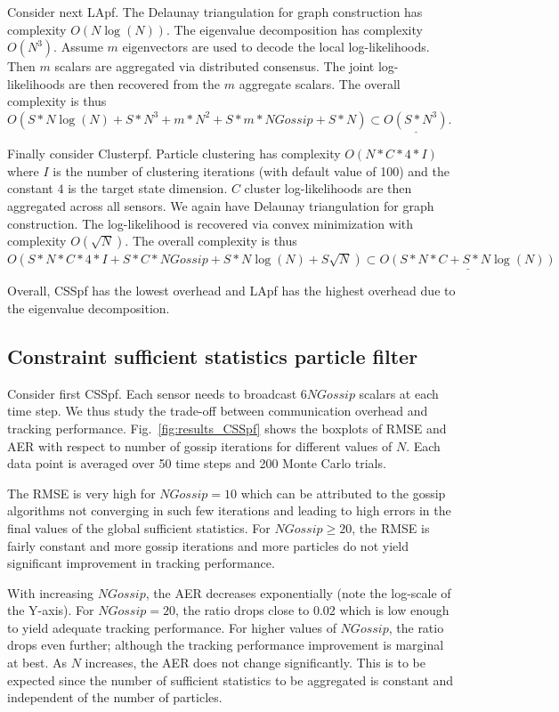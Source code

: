 \documentclass[10pt,letterpaper,final]{article}
\begin{document}
Consider next LApf. The Delaunay triangulation for graph construction has complexity $O(N\log(N))$. The eigenvalue decomposition has complexity $O(N^3)$. Assume $m$ eigenvectors are used to decode the local log-likelihoods. Then $m$ scalars are aggregated via distributed consensus. The joint log-likelihoods are then recovered from the $m$ aggregate scalars. The overall complexity is thus $O(S*N\log(N)+S*N^3+m*N^2+S*m*NGossip+S*N)\subset \underline{O(S*N^3)}$. 

Finally consider Clusterpf. Particle clustering has complexity $O(N*C*4*I)$ where $I$ is the number of clustering iterations (with default value of 100) and the constant $4$ is the target state dimension. $C$ cluster log-likelihoods are then aggregated across all sensors. We again have Delaunay triangulation for graph construction. The log-likelihood is recovered via convex minimization with complexity $O(\sqrt{N})$. The overall complexity is thus $O(S*N*C*4*I+S*C*NGossip + S*N\log(N)+S\sqrt{N})\subset \underline{O(S*N*C+S*N\log(N))}$

Overall, CSSpf has the lowest overhead and LApf has the highest overhead due to the eigenvalue decomposition. 

\subsection{Constraint sufficient statistics particle filter}
Consider first CSSpf. Each sensor needs to broadcast $6NGossip$ scalars at each time step. We thus study the trade-off between communication overhead and tracking performance. Fig.~\ref{fig:results_CSSpf} shows the boxplots of RMSE and AER with respect to number of gossip iterations for different values of $N$. Each data point is averaged over 50 time steps and 200 Monte Carlo trials. 

The RMSE is very high for $NGossip=10$ which can be attributed to the gossip algorithms not converging in such few iterations and leading to high errors in the final values of the global sufficient statistics. For $NGossip\geq 20$, the RMSE is fairly constant and more gossip iterations and more particles do not yield significant improvement in tracking performance. 


With increasing $NGossip$, the AER decreases exponentially (note the log-scale of the Y-axis). For $NGossip=20$, the ratio drops close to 0.02 which is low enough to yield adequate tracking performance. For higher values of $NGossip$, the ratio drops even further; although the tracking performance improvement is marginal at best. As $N$ increases, the AER does not change significantly. This is to be expected since the number of sufficient statistics to be aggregated is constant and independent of the number of particles. 
\end{document}
